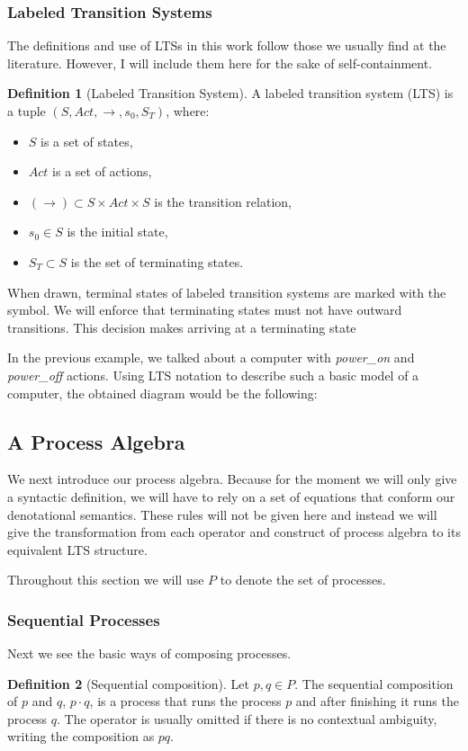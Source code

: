 \documentclass[11pt]{article}
\theoremstyle{definition}
\newtheorem{definition}{Definition}
\newcommand{\cmark}{\ding{51}}
\theoremstyle{plain}
\theoremstyle{definition}
\begin{document}
\subsubsection{Labeled Transition Systems}
The definitions and use of LTSs in this work follow those we usually find at the literature. However, I will include them here for the sake of self-containment.
\begin{definition} [Labeled Transition System]
	A labeled transition system (LTS) is a tuple $ (S,Act,\rightarrow,s_0,S_T)  $, where:
	\begin{itemize}
		\item $ S $ is a set of states,
		\item $ Act $ is a set of actions,
		\item $ (\rightarrow) \subset S \times Act \times S $ is the transition relation,
		\item $ s_0 \in S$ is the initial state,
		\item $ S_T \subset S $ is the set of terminating states.
	\end{itemize}
	When drawn, terminal states of labeled transition systems are marked with the \cmark symbol.
	We will enforce that terminating states must not have outward transitions. This decision makes arriving at a terminating state 
\end{definition}
In the previous example, we talked about a computer with \emph{power\_on} and \emph{power\_off} actions. Using LTS notation to describe such a basic model of a computer, the obtained diagram would be the following:

\subsection{A Process Algebra}
We next introduce our process algebra. Because for the moment we will only give a syntactic definition, we will have to rely on a set of equations that conform our denotational semantics. These rules will not be given here and instead we will give the transformation from each operator and construct of process algebra to its equivalent LTS structure.


Throughout this section we will use $ P $ to denote the set of processes.
\subsubsection{Sequential Processes}
Next we see the basic ways of composing processes.
\begin{definition} [Sequential composition]
	Let $ p, q \in P $. The sequential composition of $ p $ and $ q $, $ p \cdot q $, is a process that runs the process $ p $ and after finishing it runs the process $ q $. The operator is usually omitted if there is no contextual ambiguity, writing the composition as $ pq $.
\end{definition}
\end{document}
